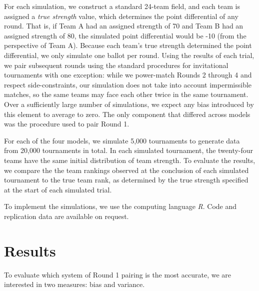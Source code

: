 \documentclass{tufte-handout}
\begin{document}
For each simulation, we construct a standard 24-team field, and each team is assigned a \emph{true strength} value, which determines the point differential of any round. That is, if Team A had an assigned strength of 70 and Team B had an assigned strength of 80, the simulated point differential would be -10 (from the perspective of Team A). Because each team's true strength determined the point differential, we only simulate one ballot per round. Using the results of each trial, we pair subsequent rounds using the standard procedures for invitational tournaments with one exception: while we power-match Rounds 2 through 4 and respect side-constraints, our simulation does not take into account impermissible matches, so the same teams may face each other twice in the same tournament. Over a sufficiently large number of simulations, we expect any bias introduced by this element to average to zero. The only component that differed across models was the procedure used to pair Round 1.

For each of the four models, we simulate 5,000 tournaments to generate data from 20,000 tournaments in total. In each simulated tournament, the twenty-four teams have the same initial distribution of team strength. To evaluate the results, we compare the the team rankings observed at the conclusion of each simulated tournament to the true team rank, as determined by the true strength specified at the start of each simulated trial. 

To implement the simulations, we use the computing language \emph{R}. Code and replication data are available on request.

\section{Results}

To evaluate which system of Round 1 pairing is the most accurate, we are interested in two measures: bias and variance.
\end{document}
